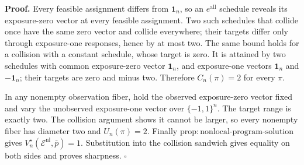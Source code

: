 \textbf{Proof.}
Every feasible assignment differs from \(\mathbf 1_n\), so an \(e^{\mathrm{all}}\) schedule reveals its exposure-zero vector at every feasible assignment. Two such schedules that collide once have the same zero vector and collide everywhere; their targets differ only through exposure-one responses, hence by at most two. The same bound holds for a collision with a constant schedule, whose target is zero. It is attained by two schedules with common exposure-zero vector \(\mathbf 1_n\), and exposure-one vectors \(\mathbf 1_n\) and \(-\mathbf 1_n\); their targets are zero and minus two. Therefore \(C_n(\pi)=2\) for every \(\pi\).

In any nonempty observation fiber, hold the observed exposure-zero vector fixed and vary the unobserved exposure-one vector over \(\{-1,1\}^n\). The target range is exactly two. The collision argument shows it cannot be larger, so every nonempty fiber has diameter two and \(U_n(\pi)=2\). Finally \(\mathrm{prop{:}nonlocal\text{-}program\text{-}solution}\) gives \(V_n^\star(\mathcal E^{\mathrm{nl}},\bar p)=1\). Substitution into the collision sandwich gives equality on both sides and proves sharpness. \(\square\)